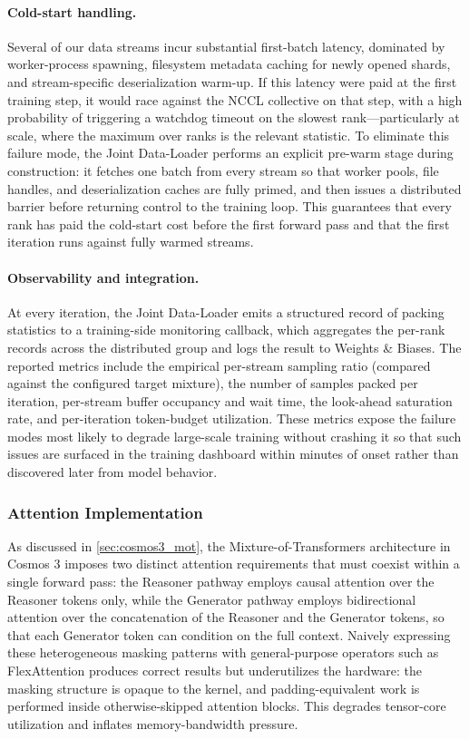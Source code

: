 \paragraph{Cold-start handling.}
Several of our data streams incur substantial first-batch latency, dominated by worker-process spawning, filesystem metadata caching for newly opened shards, and stream-specific deserialization warm-up. If this latency were paid at the first training step, it would race against the NCCL collective on that step, with a high probability of triggering a watchdog timeout on the slowest rank---particularly at scale, where the maximum over ranks is the relevant statistic. To eliminate this failure mode, the Joint Data-Loader performs an explicit pre-warm stage during construction: it fetches one batch from every stream so that worker pools, file handles, and deserialization caches are fully primed, and then issues a distributed barrier before returning control to the training loop. This guarantees that every rank has paid the cold-start cost before the first forward pass and that the first iteration runs against fully warmed streams.

\paragraph{Observability and integration.}
At every iteration, the Joint Data-Loader emits a structured record of packing statistics to a training-side monitoring callback, which aggregates the per-rank records across the distributed group and logs the result to Weights \& Biases. The reported metrics include the empirical per-stream sampling ratio (compared against the configured target mixture), the number of samples packed per iteration, per-stream buffer occupancy and wait time, the look-ahead saturation rate, and per-iteration token-budget utilization. These metrics expose the failure modes most likely to degrade large-scale training without crashing it so that such issues are surfaced in the training dashboard within minutes of onset rather than discovered later from model behavior.

\subsubsection{Attention Implementation}

As discussed in \cref{sec:cosmos3_mot}, the Mixture-of-Transformers architecture in Cosmos 3 imposes two distinct attention requirements that must coexist within a single forward pass: the Reasoner pathway employs causal attention over the Reasoner tokens only, while the Generator pathway employs bidirectional attention over the concatenation of the Reasoner and the Generator tokens, so that each Generator token can condition on the full context. Naively expressing these heterogeneous masking patterns with general-purpose operators such as FlexAttention produces correct results but underutilizes the hardware: the masking structure is opaque to the kernel, and padding-equivalent work is performed inside otherwise-skipped attention blocks. This degrades tensor-core utilization and inflates memory-bandwidth pressure.

